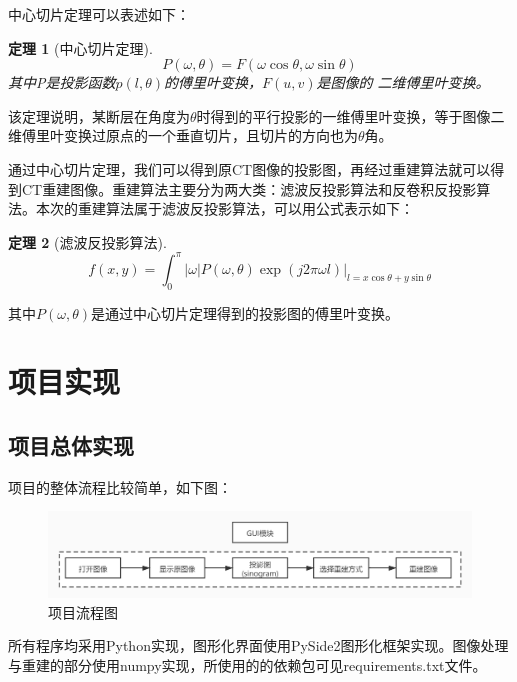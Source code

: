 \documentclass[UTF8]{ctexart}
\newtheorem{theorem}{定理}
\begin{document}
中心切片定理可以表述如下：
\begin{theorem}[中心切片定理]
    $$P(\omega,\theta)=F(\omega\cos\theta,\omega\sin\theta)$$
    其中P是投影函数$p(l,\theta)$的傅里叶变换，$F(u,v)$是图像的
    二维傅里叶变换。
\end{theorem}
该定理说明，某断层在角度为$\theta$时得到的平行投影的一维傅里叶变换，等于图像二维傅里叶变换过原点的一个垂直切片，且切片的方向也为$\theta$角。

通过中心切片定理，我们可以得到原CT图像的投影图，再经过重建算法就可以得到CT重建图像。重建算法主要分为两大类：滤波反投影算法和反卷积反投影算法。本次的重建算法属于滤波反投影算法，可以用公式表示如下：

\begin{theorem}[滤波反投影算法]
    $$f(x,y)=\int_0^{\pi}|\omega|P(\omega,\theta)\exp(j2\pi\omega l)\lvert_{l=x\cos\theta+y\sin\theta}$$
\end{theorem}
其中$P(\omega,\theta)$是通过中心切片定理得到的投影图的傅里叶变换。

\section{项目实现}
\subsection{项目总体实现}
项目的整体流程比较简单，如下图：

\begin{figure}[H]
    \centering
    \includegraphics[width=\textwidth]{../image/workflow.jpg}
    \caption{项目流程图}
    \label{fig workflow}
\end{figure}
所有程序均采用Python实现，图形化界面使用PySide2图形化框架实现。图像处理与重建的部分使用numpy实现，所使用的的依赖包可见requirements.txt文件。
\end{document}
